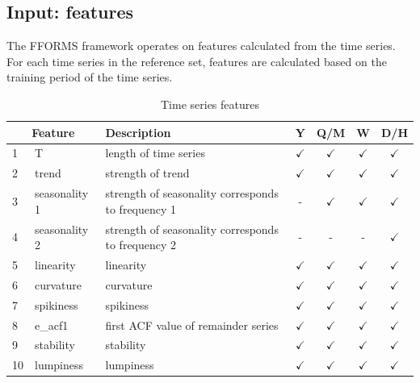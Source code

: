 \documentclass[11pt,a4paper,]{article}
\def\yes{$\checkmark$}
\begin{document}
\subsection{Input: features}\label{input-features}

The FFORMS framework operates on features calculated from the time
series. For each time series in the reference set, features are
calculated based on the training period of the time series.

\begin{table}[!htp]
\centering\footnotesize\tabcolsep=0.12cm
\caption{Time series features}
\label{feature}
\begin{tabular}{llp{}cccc}
\toprule
\multicolumn{2}{c}{Feature} & Description & Y & Q/M & W & D/H\\
\midrule
1  & T              & length of time series                                                                   & \yes  & \yes & \yes & \yes\\
2  & trend          & strength of trend                                                                       & \yes  & \yes & \yes & \yes\\
3  & seasonality 1    & strength of seasonality corresponds to frequency 1                                                              & -     & \yes & \yes & \yes\\
4  & seasonality 2    & strength of seasonality corresponds to frequency 2                                                              & -     & - & -& \yes\\
5  & linearity      & linearity                                                                               & \yes  & \yes & \yes & \yes\\
6  & curvature      & curvature                                                                               & \yes  & \yes & \yes & \yes\\
7  & spikiness      & spikiness                                                                               & \yes  & \yes & \yes & \yes\\
8  & e\_acf1        & first ACF value of remainder series                                                     & \yes  & \yes & \yes & \yes\\
9  & stability      & stability                                                                               & \yes  & \yes & \yes & \yes\\
10  & lumpiness      & lumpiness                                                                               & \yes  & \yes & \yes & \yes\\

\end{tabular}
\end{table}
\end{document}
